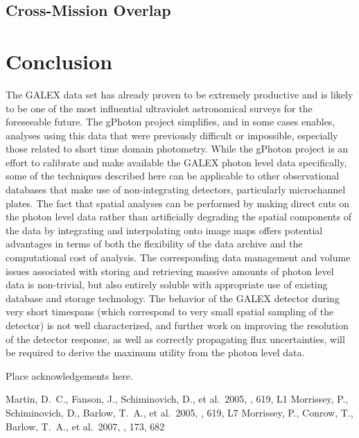 \documentclass[preprint]{aastex}
\begin{document}
\subsection{Cross-Mission Overlap}

\section{Conclusion}
The GALEX data set has already proven to be extremely productive and is likely to be one of the most influential ultraviolet astronomical surveys for the foreseeable future. The gPhoton project simplifies, and in some cases enables, analyses using this data that were previously difficult or impossible, especially those related to short time domain photometry. While the gPhoton project is an effort to calibrate and make available the GALEX photon level data specifically, some of the techniques described here can be applicable to other observational databases that make use of non-integrating detectors, particularly microchannel plates. The fact that spatial analyses can be performed by making direct cuts on the photon level data rather than artificially degrading the spatial components of the data by integrating and interpolating onto image maps offers potential advantages in terms of both the flexibility of the data archive and the computational cost of analysis. The corresponding data management and volume issues associated with storing and retrieving massive amounts of photon level data is non-trivial, but also entirely soluble with appropriate use of existing database and storage technology. The behavior of the GALEX detector during very short timespans (which correspond to very small spatial sampling of the detector) is not well characterized, and further work on improving the resolution of the detector response, as well as correctly propagating flux uncertainties, will be required to derive the maximum utility from the photon level data.

\acknowledgements
Place acknowledgements here.

\begin{thebibliography}{}
 Martin, D.~C., Fanson, J., Schiminovich, D., et al.\ 2005, \apjl, 619, L1
 Morrissey, P., Schiminovich, D., Barlow, T.~A., et al.\ 2005, \apjl, 619, L7
 Morrissey, P., Conrow, T., Barlow, T.~A., et al.\ 2007, \apjs, 173, 682
\end{thebibliography}


\clearpage




\clearpage

\end{document}
